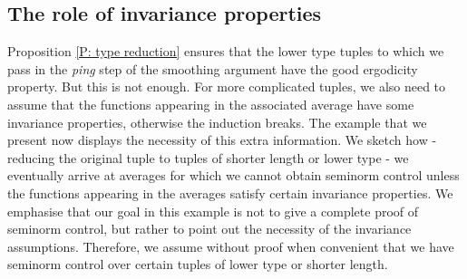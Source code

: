 \documentclass[11pt]{amsart}
\theoremstyle{definition}
\begin{document}
\subsection{The role of invariance properties}\label{SS:flipping}
Proposition \ref{P: type reduction} ensures that the lower type tuples to which we pass in the \textit{ping} step of the smoothing argument have the good ergodicity property. But this is not enough. For more complicated tuples, we also need to assume that the functions appearing in the associated average have some invariance properties, otherwise the induction breaks. The example that we present now displays the necessity of this extra information. We sketch how - reducing the original tuple to tuples of shorter length or lower type - we eventually arrive at averages for which we cannot obtain seminorm control unless the functions appearing in the averages satisfy certain invariance properties.  We emphasise that our goal in this example is not to give a complete proof of seminorm control, but rather to point out the necessity of the invariance assumptions. Therefore, we assume without proof when convenient that we have seminorm control over certain tuples of lower type or shorter length.

\end{document}

